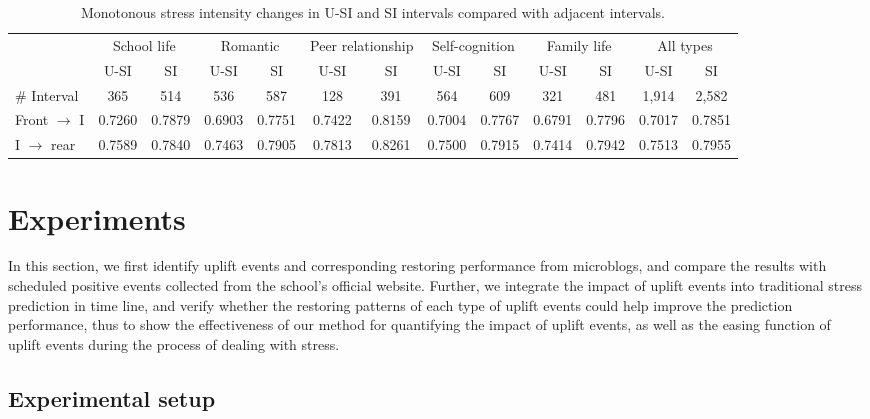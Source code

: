 \begin{table*}
\begin{center}
\caption{Monotonous stress intensity changes in U-SI and SI intervals compared with adjacent intervals.}
\begin{tabular}{l cccccc cccccc} \\\hline\hline
\multirow{2}{1cm}{}
&\multicolumn{2}{c}{School life}
&\multicolumn{2}{c}{Romantic}
&\multicolumn{2}{c}{Peer relationship}
&\multicolumn{2}{c}{Self-cognition}
&\multicolumn{2}{c}{Family life}
&\multicolumn{2}{c}{All types}\\
&U-SI	    &	SI	        &U-SI	    &SI	        &U-SI	   &SI	
&U-SI	    &	SI	        &	U-SI	&SI	        &U-SI	   &SI\\  \hline
\# Interval         &   365	        &	514	        &	536	        &	587	        &128	    &	391	        &	564	           &	609	            &	321	        &	481	        &	1,914	    &2,582	 \\
Front $\rightarrow$ I &	0.7260 	&	0.7879 	&	0.6903 	&	0.7751 	&	0.7422 	&	0.8159 	&	0.7004 	&	0.7767 	&	0.6791 &	0.7796 	&	0.7017 	&   0.7851\\
I $\rightarrow$ rear  &	0.7589 	&	0.7840 	&	0.7463 	&	0.7905 	&	0.7813 	&	0.8261 	&	0.7500 	&	0.7915 	&	0.7414 	&	0.7942 	&	0.7513 	&   0.7955\\ \hline \hline
\end{tabular}%
\label{tab:fontrear}
\end{center}
\end{table*}

\section{Experiments}
\label{sec:experiment}
In this section,
we first identify uplift events and corresponding restoring performance from microblogs,
and compare the results with scheduled positive events collected from the school's official website.
Further, we integrate the impact of uplift events into traditional stress prediction in time line,
and verify whether the restoring patterns of each type of uplift events could help improve the prediction performance,
thus to show the effectiveness of our method for quantifying the impact of uplift events,
as well as the easing function of uplift events during the process of dealing with stress.

\subsection{Experimental setup}
